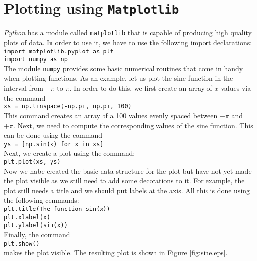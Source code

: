 \documentclass{article}
\begin{document}
\section{Plotting using \texttt{Matplotlib}}
\textsl{Python} has a module called \texttt{matplotlib} that is capable of producing high quality
plots of data.  In order to use it, we have to use the following import declarations:
\\[0.2cm]
\hspace*{1.3cm}
\texttt{import matplotlib.pyplot as plt} \\
\hspace*{1.3cm}
\texttt{import numpy as np}
\\[0.2cm]
The module \texttt{numpy} provides some basic numerical routines that come in handy when plotting
functions.  As an example, let us plot the sine function in the interval from $-\pi$ to $\pi$.  In
order to do this, we first create an array of $x$-values via the command
\\[0.2cm]
\hspace*{1.3cm}
\texttt{xs = np.linspace(-np.pi, np.pi, 100)}
\\[0.2cm]
This command creates an array of a 100 values evenly spaced between $-\pi$ and $+\pi$.  Next, we
need to compute the corresponding values of the sine function.  This can be done using the command
\\[0.2cm]
\hspace*{1.3cm}
\texttt{ys = [np.sin(x) for x in xs]}
\\[0.2cm]
Next, we create a plot using the command:
\\[0.2cm]
\hspace*{1.3cm}
\texttt{plt.plot(xs, ys)}
\\[0.2cm]
Now we habe created the basic data structure for the plot but have not yet made the plot visible as
we still need to add some decorations to it.  For example, the plot still needs a title and we
should put labels at the axis.  All this is done using the following commands:
\\[0.2cm]
\hspace*{1.3cm}
\texttt{plt.title(The function sin(x))} \\
\hspace*{1.3cm} 
\texttt{plt.xlabel(x)} \\
\hspace*{1.3cm}
\texttt{plt.ylabel(sin(x))} 
\\[0.2cm]
Finally, the command
\\[0.2cm]
\hspace*{1.3cm}
\texttt{plt.show()}
\\[0.2cm]
makes the plot visible.  The resulting plot is shown in Figure \ref{fig:sine.eps}.
\end{document}
